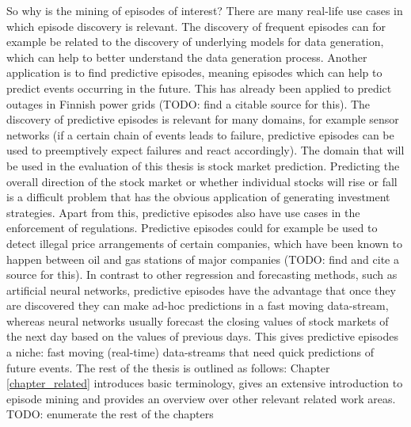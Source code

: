So why is the mining of episodes of interest? There are many real-life use cases in which episode discovery is relevant. The discovery of frequent episodes can for example be related to the discovery of underlying models for data generation, which can help to better understand the data generation process. Another application is to find predictive episodes, meaning episodes which can help to predict events occurring in the future. This has already been applied to predict outages in Finnish power grids (TODO: find a citable source for this). The discovery of predictive episodes is relevant for many domains, for example sensor networks (if a certain chain of events leads to failure, predictive episodes can be used to preemptively expect failures and react accordingly). The domain that will be used in the evaluation of this thesis is stock market prediction. Predicting the overall direction of the stock market or whether individual stocks will rise or fall is a difficult problem that has the obvious application of generating investment strategies. Apart from this, predictive episodes also have use cases in the enforcement of regulations. Predictive episodes could for example be used to detect illegal price arrangements of certain companies, which have been known to happen between oil and gas stations of major companies (TODO: find and cite a source for this). \newline
In contrast to other regression and forecasting methods, such as artificial neural networks, predictive episodes have the advantage that once they are discovered they can make ad-hoc predictions in a fast moving data-stream, whereas neural networks usually forecast the closing values of stock markets of the next day based on the values of previous days. This gives predictive episodes a niche: fast moving (real-time) data-streams that need quick predictions of future events. \newline
The rest of the thesis is outlined as follows: Chapter \ref{chapter_related} introduces basic terminology, gives an extensive introduction to episode mining and provides an overview over other relevant related work areas. TODO: enumerate the rest of the chapters %
 

